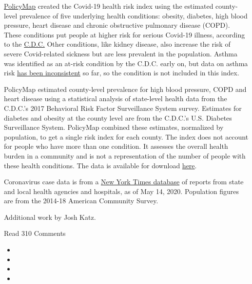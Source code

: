 \href{https://www.policymap.com/}{PolicyMap} created the Covid-19 health
risk index using the estimated county-level prevalence of five
underlying health conditions: obesity, diabetes, high blood pressure,
heart disease and chronic obstructive pulmonary disease (COPD). These
conditions put people at higher risk for serious Covid-19 illness,
according to the
\href{https://www.cdc.gov/coronavirus/2019-ncov/need-extra-precautions/people-at-higher-risk.html?CDC_AA_refVal=https\%3A\%2F\%2Fwww.cdc.gov\%2Fcoronavirus\%2F2019-ncov\%2Fspecific-groups\%2Fhigh-risk-complications.html}{C.D.C.}
Other conditions, like kidney disease, also increase the risk of severe
Covid-related sickness but are less prevalent in the population. Asthma
was identified as an at-risk condition by the C.D.C. early on, but data
on asthma risk
\href{https://www.nytimes3xbfgragh.onion/2020/04/16/health/coronavirus-asthma-risk.html}{has
been inconsistent} so far, so the condition is not included in this
index.

PolicyMap estimated county-level prevalence for high blood pressure,
COPD and heart disease using a statistical analysis of state-level
health data from the C.D.C.'s 2017 Behavioral Risk Factor Surveillance
System survey. Estimates for diabetes and obesity at the county level
are from the C.D.C.'s U.S. Diabetes Surveillance System. PolicyMap
combined these estimates, normalized by population, to get a single risk
index for each county. The index does not account for people who have
more than one condition. It assesses the overall health burden in a
community and is not a representation of the number of people with these
health conditions. The data is available for download
\href{https://www.policymap.com/issues/covid-19/\#download-data}{here}.

Coronavirus case data is from a
\href{https://www.nytimes3xbfgragh.onion/article/coronavirus-county-data-us.html}{New
York Times database} of reports from state and local health agencies and
hospitals, as of May 14, 2020. Population figures are from the 2014-18
American Community Survey.

Additional work by Josh Katz.

Read 310 Comments

\begin{itemize}
\item
\item
\item
\item
\end{itemize}

